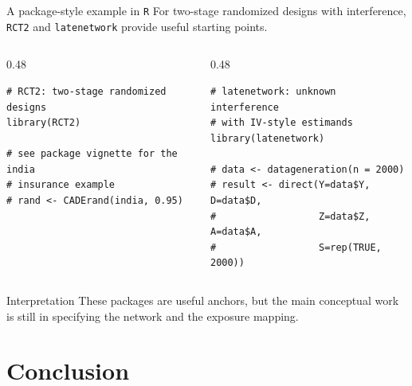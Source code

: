 \documentclass[dvipsnames,aspectratio=169,handout]{beamer}
\begin{document}
\begin{frame}[fragile]{A package-style example in \texttt{R}}
For two-stage randomized designs with interference, \texttt{RCT2} and \texttt{latenetwork} provide useful starting points.

\begin{columns}[T,onlytextwidth]
\begin{column}{0.48\textwidth}
\begin{lstlisting}
# RCT2: two-stage randomized designs
library(RCT2)

# see package vignette for the india
# insurance example
# rand <- CADErand(india, 0.95)
\end{lstlisting}
\end{column}
\begin{column}{0.48\textwidth}
\begin{lstlisting}
# latenetwork: unknown interference
# with IV-style estimands
library(latenetwork)

# data <- datageneration(n = 2000)
# result <- direct(Y=data$Y, D=data$D,
#                  Z=data$Z, A=data$A,
#                  S=rep(TRUE, 2000))
\end{lstlisting}
\end{column}
\end{columns}

\begin{alertblock}{Interpretation}
These packages are useful anchors, but the main conceptual work is still in specifying the network and the exposure mapping.
\end{alertblock}
\end{frame}


\section{Conclusion}
\end{document}

